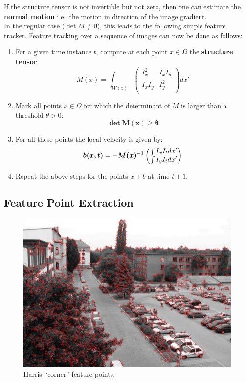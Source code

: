 If the structure tensor is not invertible but not zero,
then one can estimate the \textbf{normal motion} i.e.\ the motion
in direction of the image gradient.\\

In the regular case ($\det M \neq 0$), this leads to the following
simple feature tracker.
Feature tracking over a sequence of images can now be done as follows:
\begin{enumerate}
	\item For a given time instance $t$, compute at each point $x\in\Omega$
		the \textbf{structure tensor}
		\[
			M(x) = \int_{W(x)} \begin{pmatrix}
				I_x^2 & I_x I_y \\
				I_x I_y & I_y^2 \\
			\end{pmatrix} dx'
		\]
	\item Mark all points $x \in \Omega$ for which the determinant of $M$
		is larger than a threshold $\theta > 0$:
		\[
			\bm{\det M(x) \geq \theta}
		\]
	\item For all these points the local velocity is given by:
		\[
			\bm{b(x,t)} = - \bm{M(x)}^{-1} \begin{pmatrix}
				\int I_x I_t dx' \\
				\int I_y I_t dx' \\
			\end{pmatrix}
		\]
	\item Repeat the above steps for the points $x + b$ at time $t+1$.
\end{enumerate}


\subsection{Feature Point Extraction}%
\label{sub:feature_point_extraction}


\begin{figure}[h]
	\centering
	\includegraphics[width=\linewidth]{img/harris.jpg}
	\caption{Harris ``corner'' feature points.}%
	\label{fig:harris}
\end{figure}

